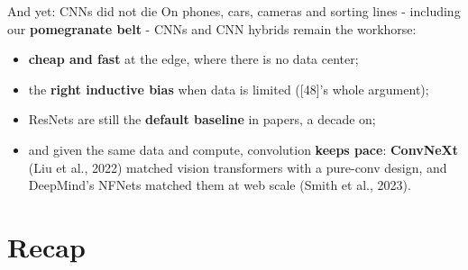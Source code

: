\documentclass[aspectratio=169]{beamer}
\begin{document}
\begin{frame}{And yet: CNNs did not die}
  On phones, cars, cameras and sorting lines - including our \textbf{pomegranate
  belt} - CNNs and CNN hybrids remain the workhorse:
  \vskip 6pt
  \begin{itemize}
    \item \textbf{cheap and fast} at the edge, where there is no data center;
    \item the \textbf{right inductive bias} when data is limited ([48]'s whole
      argument);
    \item ResNets are still the \textbf{default baseline} in papers, a decade on;
    \item and given the same data and compute, convolution \textbf{keeps pace}:
      \textbf{ConvNeXt} (Liu et al., 2022) matched vision transformers with a pure-conv
      design, and DeepMind's NFNets matched them at web scale (Smith et al., 2023).
  \end{itemize}
  \vskip 8pt
\end{frame}

\section*{Recap}
\end{document}
